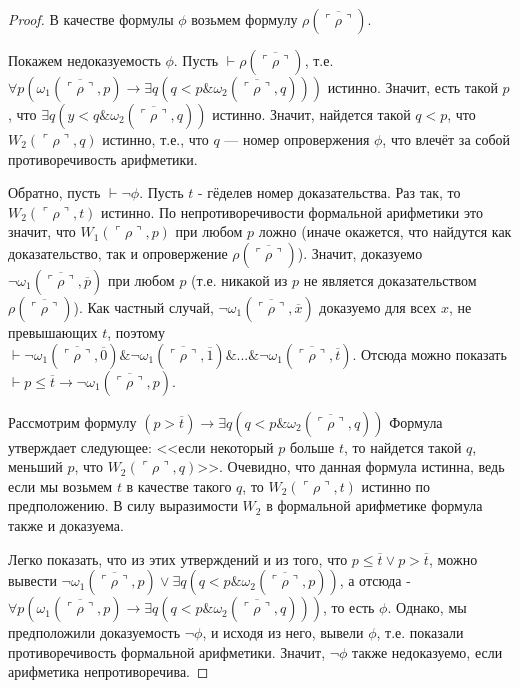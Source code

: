 \begin{proof}
В качестве формулы $\phi$ возьмем формулу $\rho(\overline{\ulcorner\rho\urcorner})$.

Покажем недоказуемость $\phi$. Пусть $\vdash \rho(\overline{\ulcorner\rho\urcorner})$, 
т.е. $\forall p (\omega_1 (\overline{\ulcorner\rho\urcorner},p) \rightarrow \exists q (q < p \& \omega_2 (\overline{\ulcorner\rho\urcorner},q)))$
истинно. Значит, есть такой $p$, что $\exists q (y < q \& \omega_2 (\overline{\ulcorner\rho\urcorner},q))$ истинно.
Значит, найдется такой $q < p$, что $W_2 (\ulcorner\rho\urcorner,q)$ истинно, т.е., что 
$q$ --- номер опровержения $\phi$, что влечёт за собой противоречивость арифметики.

Обратно, пусть $\vdash \neg \phi$. Пусть $t$ - гёделев номер доказательства.
Раз так, то $W_2 (\ulcorner\rho\urcorner,t)$ истинно. По непротиворечивости формальной арифметики
это значит, что $W_1 (\ulcorner\rho\urcorner,p)$ при любом $p$ ложно (иначе окажется, что 
найдутся как доказательство, так и опровержение $\rho(\overline{\ulcorner\rho\urcorner})$). 
Значит, доказуемо $\neg \omega_1 (\overline{\ulcorner\rho\urcorner},\overline{p})$ при 
любом $p$ (т.е. никакой из $p$ не является доказательством $\rho(\overline{\ulcorner\rho\urcorner})$). 
Как частный случай, $\neg \omega_1 (\overline{\ulcorner\rho\urcorner},\overline{x})$ доказуемо для
всех $x$, не превышающих $t$, поэтому 
$\vdash \neg \omega_1 (\overline{\ulcorner\rho\urcorner},\overline{0}) \& \neg \omega_1 (\overline{\ulcorner\rho\urcorner},\overline{1}) \& ... \& \neg \omega_1 (\overline{\ulcorner\rho\urcorner},\overline{t})$.
Отсюда можно показать $\vdash p \le \overline{t} \rightarrow \neg \omega_1 (\overline{\ulcorner\rho\urcorner},p)$.

Рассмотрим формулу $(p > \overline{t}) \rightarrow \exists q (q < p \& \omega_2 (\overline{\ulcorner\rho\urcorner},q))$
Формула утверждает следующее: <<если некоторый $p$ больше $t$, то найдется
такой $q$, меньший $p$, что $W_2 (\ulcorner\rho\urcorner,q)$>>. Очевидно, что данная формула истинна,
ведь если мы возьмем $t$ в качестве такого $q$, то $W_2 (\ulcorner\rho\urcorner,t)$ истинно 
по предположению. В силу выразимости $W_2$ в формальной арифметике формула также и доказуема.

Легко показать, что из этих утверждений и из того, что $p \le \overline{t} \vee p > \overline{t}$,
можно вывести $\neg \omega_1 (\overline{\ulcorner\rho\urcorner},p) \vee \exists q (q < p \& \omega_2 (\overline{\ulcorner\rho\urcorner},p))$,
а отсюда - $\forall p (\omega_1 (\overline{\ulcorner\rho\urcorner},p) \rightarrow \exists q (q < p \& \omega_2 (\overline{\ulcorner\rho\urcorner},q)))$,
то есть $\phi$. Однако, мы предположили доказуемость $\neg \phi$, и исходя из него,
вывели $\phi$, т.е. показали противоречивость формальной арифметики. Значит, 
$\neg \phi$ также недоказуемо, если арифметика непротиворечива.
\end{proof}

